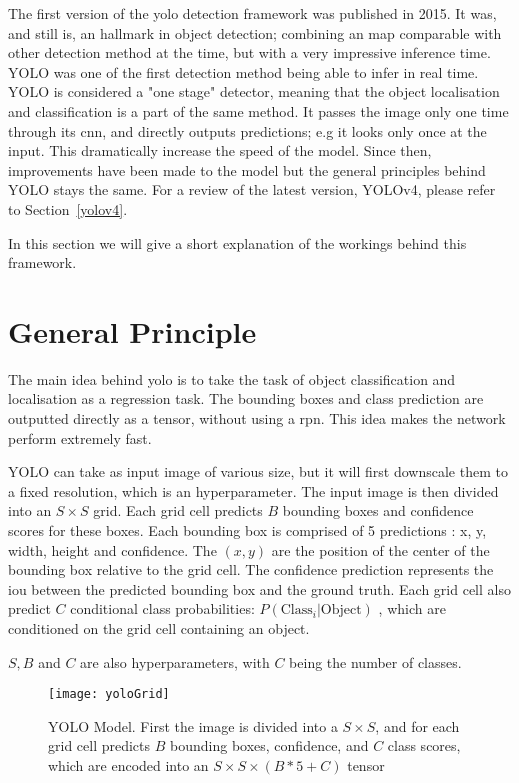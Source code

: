 The first version of the \gls{yolo} detection framework was published in 2015\cite{yolov1}. It was, and still is, an hallmark in object detection; combining an \gls{map} comparable with other detection method at the time, but with a very impressive inference time. YOLO was one of the first detection method being able to infer in real time. YOLO is considered a "one stage" detector, meaning that the object localisation and classification is a part of the same method. It passes the image only one time through its \gls{cnn}, and directly outputs predictions; e.g it looks only once at the input. This dramatically increase the speed of the model. Since then, improvements\cite{yolov9000}\cite{yolov3} have been made to the model but the general principles behind YOLO stays the same. For a review of the latest version, YOLOv4\cite{yolov4}, please refer to Section~\ref{yolov4}.  

In this section we will give a short explanation of the workings behind this framework.

\section{General Principle}
The main idea behind \gls{yolo} is to take the task of object classification and localisation as a regression task. The bounding boxes and class prediction are outputted directly as a tensor, without using a \gls{rpn}. This idea makes the network perform extremely fast.


YOLO can take as input image of various size, but it will first downscale them to a fixed resolution, which is an \gls{hyperparameter}. The input image is then divided into an $S \times S$ grid. Each grid cell predicts $B$ bounding boxes and confidence scores for these boxes. Each bounding box is comprised of 5 predictions : x, y, width, height and confidence. The $(x,y)$ are the position of the center of the bounding box relative to the grid cell. The confidence prediction represents the \gls{iou} between the predicted bounding box and the ground truth. Each grid cell also predict $C$ conditional class probabilities: $P(\text{Class}_i|\text{Object})$ , which are conditioned on the grid cell containing an object. 

$S, B$ and $C$ are also \glspl{hyperparameter}, with $C$ being the number of classes. 

\begin{figure}[h!]
  \centering
  \texttt{[image: yoloGrid]}
	\caption[YOLO model]{YOLO Model. First the image is divided into a $S \times S$, and for each grid cell predicts $B$ bounding boxes, confidence, and $C$ class scores, which are encoded into an $S \times S \times (B * 5 + C)$ tensor}
  \label{fig:yoloModel}
\end{figure}

